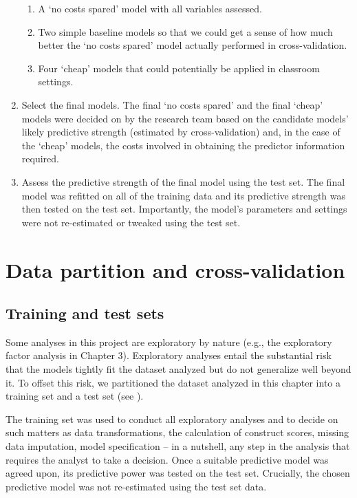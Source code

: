 \documentclass[output=paper]{langsci/langscibook}
\begin{document}
\begin{enumerate}
\begin{enumerate}[label=\alph*.]
\item A ‘no costs spared’ model with all variables assessed.
\item Two simple baseline models so that we could get a sense of how much better the ‘no costs spared’ model actually performed in cross-validation.
\item Four ‘cheap’ models that could potentially be applied in classroom settings.
\end{enumerate}
\item Select the final models. The final ‘no costs spared’ and the final ‘cheap’ models were decided on by the research team based on the candidate models’ likely predictive strength (estimated by cross-validation) and, in the case of the ‘cheap’ models, the costs involved in obtaining the predictor information required.
\item Assess the predictive strength of the final model using the test set. The final model was refitted on all of the training data and its predictive strength was then tested on the test set. Importantly, the model’s parameters and settings were not re-estimated or tweaked using the test set.
\end{enumerate}

\section{Data partition and cross-validation}
\subsection{Training and test sets}

Some analyses in this project are exploratory by nature (e.g., the exploratory factor analysis in Chapter 3). Exploratory analyses entail the substantial risk that the models tightly fit the dataset analyzed but do not generalize well beyond it. To offset this risk, we partitioned the dataset analyzed in this chapter into a training set and a test set (see \citealt{KuhnJohnson2013}).

The training set was used to conduct all exploratory analyses and to decide on such matters as data transformations, the calculation of construct scores, missing data imputation, model specification -- in a nutshell, any step in the analysis that requires the analyst to take a decision. Once a suitable predictive model was agreed upon, its predictive power was tested on the test set. Crucially, the chosen predictive model was not re-estimated using the test set data.
\end{document}

